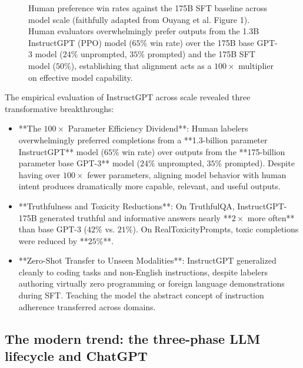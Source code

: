\documentclass[../../main.tex]{subfiles}
\begin{document}
\begin{figure}[t]
\caption{Human preference win rates against the 175B SFT baseline across model scale (faithfully adapted from Ouyang et al. \citep{ouyang2022} Figure 1). Human evaluators overwhelmingly prefer outputs from the 1.3B InstructGPT (PPO) model ($65\%$ win rate) over the 175B base GPT-3 model ($24\%$ unprompted, $35\%$ prompted) and the 175B SFT model ($50\%$), establishing that alignment acts as a $100\times$ multiplier on effective model capability.}
\label{fig:instructgpt_win_rates_scaling}
\end{figure}

The empirical evaluation of InstructGPT across scale revealed three transformative breakthroughs:
\begin{itemize}
    \item **The $100\times$ Parameter Efficiency Dividend**: Human labelers overwhelmingly preferred completions from a **1.3-billion parameter InstructGPT** model ($65\%$ win rate) over outputs from the **175-billion parameter base GPT-3** model ($24\%$ unprompted, $35\%$ prompted). Despite having over $100\times$ fewer parameters, aligning model behavior with human intent produces dramatically more capable, relevant, and useful outputs.
    \item **Truthfulness and Toxicity Reductions**: On TruthfulQA, InstructGPT-175B generated truthful and informative answers nearly **$2\times$ more often** than base GPT-3 ($42\%$ vs. $21\%$). On RealToxicityPrompts, toxic completions were reduced by **$25\%$**.
    \item **Zero-Shot Transfer to Unseen Modalities**: InstructGPT generalized cleanly to coding tasks and non-English instructions, despite labelers authoring virtually zero programming or foreign language demonstrations during SFT. Teaching the model the abstract concept of instruction adherence transferred across domains.
\end{itemize}

\subsection{The modern trend: the three-phase LLM lifecycle and ChatGPT}
\label{subsec:modern_trend_chatgpt_three_phase}
\end{document}
